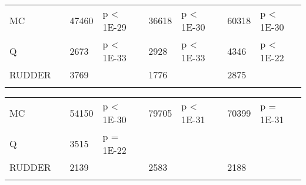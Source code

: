 \documentclass{article}
\begin{document}
\begin{appendices}
\begin{landscape}
\begin{table}[htp]
\begin{flushleft}
\begin{tabular}
\end{tabular}
\end{flushleft}

\begin{flushleft}
\begin{tabular}{*{1}{>{\raggedright}p{6em}}*{1}{>{\raggedleft}p{4em}}*{1}{>{\raggedleft}p{5em}}*{1}{>{\raggedright}p{5em}}*{1}{>{\columncolor{mColor1}\raggedleft}p{4em}}*{1}{>{\columncolor{mColor1}\raggedleft}p{5em}}*{1}{>{\columncolor{mColor1}\raggedright}p{5em}}*{1}{>{\raggedleft}p{4em}}*{1}{>{\raggedleft}p{5em}}*{1}{>{\raggedright}p{5em}}*{1}{>{\raggedright}p{0.01em}}}
\toprule[1pt]
\addlinespace[2pt]
{\bf Method} &\multicolumn{3}{c}{\bf Delay 25} &\multicolumn{3}{c}{\bf Delay 30} &\multicolumn{3}{c}{\bf Delay 35} &\\
\toprule[1pt]
MC & 39772 & {\small  47460} & {\small p < 1E-29} & 41922 & {\small  36618} & {\small p < 1E-30} & 50464 & {\small  60318} & {\small p < 1E-30} &  \\
Q & 234912 & {\small  2673} & {\small p < 1E-33} & 305894 & {\small  2928} & {\small p < 1E-33} & 383422 & {\small  4346} & {\small p < 1E-22} &  \\
RUDDER & 4112 & {\small  3769} &  & 3667 & {\small  1776} &  & 3850 & {\small  2875} & &  \\
\addlinespace[1pt]
\end{tabular}
\end{flushleft}

\begin{flushleft}
\begin{tabular}{*{1}{>{\raggedright}p{6em}}*{1}{>{\columncolor{mColor1}\raggedleft}p{4em}}*{1}{>{\columncolor{mColor1}\raggedleft}p{5em}}*{1}{>{\columncolor{mColor1}\raggedright}p{5em}}*{1}{>{\raggedleft}p{4em}}*{1}{>{\raggedleft}p{5em}}*{1}{>{\raggedright}p{5em}}*{1}{>{\columncolor{mColor1}\raggedleft}p{4em}}*{1}{>{\columncolor{mColor1}\raggedleft}p{5em}}*{1}{>{\columncolor{mColor1}\raggedright}p{5em}}*{1}{>{\raggedright}p{0.01em}}}
\toprule[1pt]
\addlinespace[2pt]
{\bf Method} &\multicolumn{3}{c}{\bf Delay 40} &\multicolumn{3}{c}{\bf Delay 45} &\multicolumn{3}{c}{\bf Delay 50} &\\
\toprule[1pt]
MC & 56945 & {\small  54150} & {\small p < 1E-30} & 69845 & {\small  79705} & {\small p < 1E-31} & 73243 & {\small  70399} & {\small p = 1E-31} &  \\
Q & 466531 & {\small  3515} & {\small p = 1E-22} &  &  &  &  &  &  &  \\
RUDDER & 3739 & {\small  2139} &  & 4151 & {\small  2583} &  & 3884 & {\small  2188} &  &  \\
\addlinespace[1pt]
\end{tabular}
\end{flushleft}


\end{table}
\end{landscape}
\end{appendices}
\end{document}

